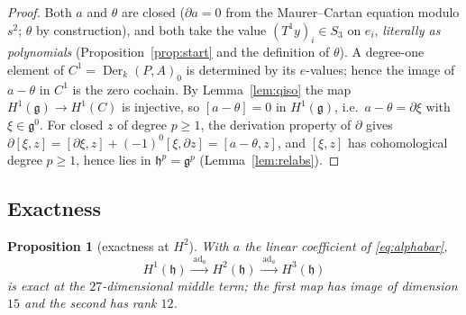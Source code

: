 \documentclass[11pt]{article}
\newtheorem{proposition}[theorem]{Proposition}
\theoremstyle{definition}
\theoremstyle{remark}
\newcommand{\Der}{\operatorname{Der}}
\newcommand{\ad}{\operatorname{ad}}
\newcommand{\g}{\mathfrak g}
\newcommand{\h}{\mathfrak h}
\begin{document}
\begin{proof}
Both $a$ and $\theta$ are closed ($\partial a=0$ from the Maurer--Cartan
equation modulo $s^2$; $\theta$ by construction), and both take the value
$(T^1y)_i\in S_3$ on $e_i$, \emph{literally as polynomials}
(Proposition~\ref{prop:start} and the definition of $\theta$).  A
degree-one element of $C^1=\Der_k(P,A)_0$ is determined by its $e$-values;
hence the image of $a-\theta$ in $C^1$ is the zero cochain.  By
Lemma~\ref{lem:qiso} the map $H^1(\g)\to H^1(C)$ is injective, so
$[a-\theta]=0$ in $H^1(\g)$, i.e.\ $a-\theta=\partial\xi$ with
$\xi\in\g^0$.  For closed $z$ of degree $p\geq1$, the derivation property
of $\partial$ gives
$\partial[\xi,z]=[\partial\xi,z]+(-1)^0[\xi,\partial z]=[a-\theta,z]$,
and $[\xi,z]$ has cohomological degree $p\geq1$, hence lies in
$\h^p=\g^p$ (Lemma~\ref{lem:relabs}).
\end{proof}

\subsection{Exactness}

\begin{proposition}[exactness at $H^2$]\label{prop:exact}
With $a$ the linear coefficient of \eqref{eq:alphabar},
\[
 H^1(\h)\xrightarrow{\;\ad_a\;}H^2(\h)\xrightarrow{\;\ad_a\;}H^3(\h)
\tag{5.2}\label{eq:sequence}
\]
is exact at the $27$-dimensional middle term; the first map has image of
dimension $15$ and the second has rank $12$.
\end{proposition}
\end{document}
